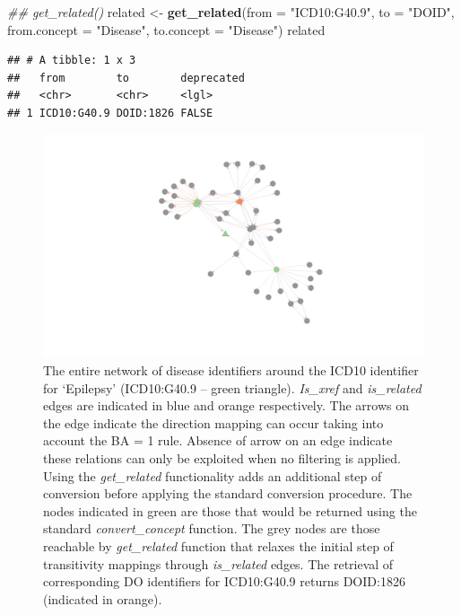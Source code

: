 \documentclass[9pt,a4paper,]{extarticle}
\newenvironment{Shaded}{\begin{snugshade}}{\end{snugshade}}
\newcommand{\CommentTok}[1]{\textcolor[rgb]{0.56,0.35,0.01}{\textit{#1}}}
\newcommand{\DataTypeTok}[1]{\textcolor[rgb]{0.13,0.29,0.53}{#1}}
\newcommand{\KeywordTok}[1]{\textcolor[rgb]{0.13,0.29,0.53}{\textbf{#1}}}
\newcommand{\NormalTok}[1]{#1}
\newcommand{\StringTok}[1]{\textcolor[rgb]{0.31,0.60,0.02}{#1}}
\begin{document}
\begin{Shaded}
\begin{Highlighting}[]
\CommentTok{## get_related()}
\NormalTok{related <-}\StringTok{ }\KeywordTok{get_related}\NormalTok{(}\DataTypeTok{from =} \StringTok{"ICD10:G40.9"}\NormalTok{,}
                       \DataTypeTok{to =} \StringTok{"DOID"}\NormalTok{, }
                       \DataTypeTok{from.concept =} \StringTok{"Disease"}\NormalTok{,}
                       \DataTypeTok{to.concept =} \StringTok{"Disease"}\NormalTok{)}
\NormalTok{related}
\end{Highlighting}
\end{Shaded}

\begin{verbatim}
## # A tibble: 1 x 3
##   from        to        deprecated
##   <chr>       <chr>     <lgl>     
## 1 ICD10:G40.9 DOID:1826 FALSE
\end{verbatim}



\begin{figure}

{\centering \includegraphics[width=1.2\linewidth]{DODO-F1000-publication_files/figure-latex/getRelated-1} 

}

\caption{The entire network of disease identifiers around the ICD10 identifier for `Epilepsy' (ICD10:G40.9 -- green triangle). \emph{Is\_xref} and \emph{is\_related} edges are indicated in blue and orange respectively. The arrows on the edge indicate the direction mapping can occur taking into account the BA = 1 rule. Absence of arrow on an edge indicate these relations can only be exploited when no filtering is applied. Using the \emph{get\_related} functionality adds an additional step of conversion before applying the standard conversion procedure. The nodes indicated in green are those that would be returned using the standard \emph{convert\_concept} function. The grey nodes are those reachable by \emph{get\_related} function that relaxes the initial step of transitivity mappings through \emph{is\_related} edges. The retrieval of corresponding DO identifiers for ICD10:G40.9 returns DOID:1826 (indicated in orange).}\label{fig:getRelated}
\end{figure}
\end{document}
